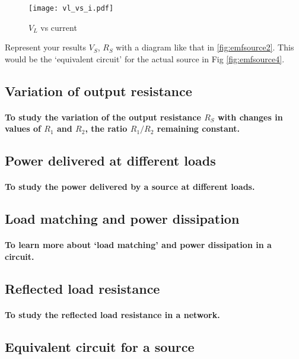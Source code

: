 \documentclass[12pt]{book}
\begin{document}
\begin{figure}
    \centering
    \texttt{[image: vl\_vs\_i.pdf]}
    \caption{$V_L$ vs current}
    \label{fig:vl-vs-i}
\end{figure}

Represent your results $V_S$, $R_S$ with a diagram like that in \ref{fig:emfsource2}. This would be the `equivalent circuit' for the actual source in Fig \ref{fig:emfsource4}.
\subsection{Variation of output resistance}
\paragraph{To study the variation of the output resistance $R_S$ with changes in values of $R_1$ and $R_2$, the ratio $R_1/R_2$ remaining constant.}
\subsection{Power delivered at different loads}
\paragraph{To study the power delivered by a source at different loads.}
\subsection{Load matching and power dissipation}
\paragraph{To learn more about `load matching' and power dissipation in a circuit.}
\subsection{Reflected load resistance}%
\paragraph{To study the reflected load resistance in a network.}
\subsection{Equivalent circuit for a source}%
\end{document}
